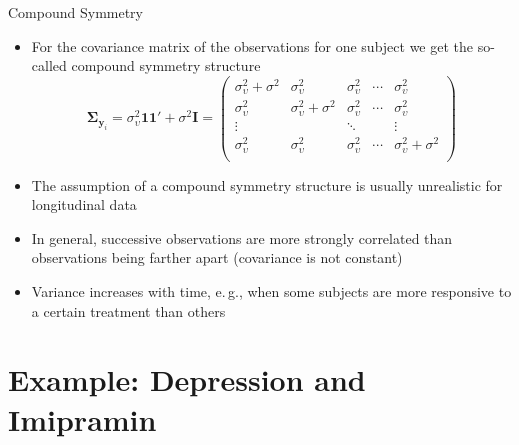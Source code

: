 \documentclass[aspectratio=169]{beamer}
\newcommand{\vect}[1]{\mathbf{#1}}
\newcommand{\mat}[1]{\mathbf{#1}}
\newcommand{\gvect}[1]{\boldsymbol{#1}}
\begin{document}
\begin{frame}{Compound Symmetry}
  \begin{itemize}
    \item For the covariance matrix of the observations for
      one subject we get the so-called compound symmetry structure
\[
  \gvect{\Sigma}_{\vect{y}_i} = \sigma^2_\upsilon \vect{1} \vect{1}'
    + \sigma^2 \mat{I}
  = 
  \begin{pmatrix}
    \sigma^2_\upsilon + \sigma^2 & \sigma^2_\upsilon & \sigma^2_\upsilon &
      \cdots & \sigma^2_\upsilon \\
    \sigma^2_\upsilon & \sigma^2_\upsilon  + \sigma^2 & \sigma^2_\upsilon &
      \cdots & \sigma^2_\upsilon \\
    \vdots & & \ddots & & \vdots \\
    \sigma^2_\upsilon & \sigma^2_\upsilon  & \sigma^2_\upsilon &
      \cdots & \sigma^2_\upsilon + \sigma^2 \\
  \end{pmatrix}
\]
    \item The assumption of a compound symmetry structure is usually
      unrealistic for longitudinal data
    \item In general, successive observations are more strongly correlated
      than observations being farther apart (covariance is not constant)
    \item Variance increases with time, e.\,g., when some subjects are more
      responsive to a certain treatment than others
  \end{itemize}
\end{frame}

\section[Example]{Example: Depression and Imipramin}
\end{document}
